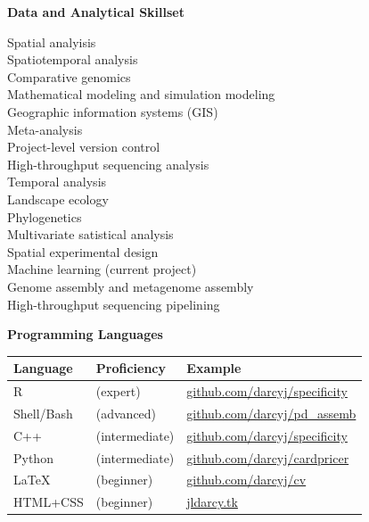 \documentclass{article}
\begin{document}
{\large  \textbf{Data and Analytical Skillset}}
  \begin{adjustwidth}{2mm}{}\begin{multicols}{2}
    Spatial analyisis \cite{Darcy2018a,Darcy2011a,Darcy640029}\\
    Spatiotemporal analysis \cite{Darcy640029,Darcy2017,Nemergut2016}\\
    Comparative genomics \cite{Darcy2018,Lynch2014}\\
    Mathematical modeling and simulation modeling \cite{Darcy685644,Darcy640029, Darcy2016}\\
    Geographic information systems (GIS) \cite{Darcy640029,Darcy2018a,Darcy2017}\\
    Meta-analysis \cite{Darcy685644,Darcy2018a,Darcy2011a}\\
    Project-level version control \cite[\href{https://github.com/darcyj/specificity}{specificity} R package]{Darcy2018}\\
    High-throughput sequencing analysis \cite{Darcy685644,Darcy640029,Darcy2018a}\\

    Temporal analysis \cite{Darcy685644,Knelman2014,Kennedy2016}\\
    Landscape ecology \cite{Darcy640029,Darcy2018,Darcy2017}\\
    Phylogenetics \cite{Darcy2011a,Schmidt2015a,Naff2013}\\
    Multivariate satistical analysis \cite{Darcy640029,Darcy2017,Gendron2019}\\
    Spatial experimental design \cite{Darcy2018a,Darcy2017,Darcy2018}\\
    Machine learning (current project)\\
    Genome assembly and metagenome assembly \cite{Darcy2018,Lynch2014}\\
    High-throughput sequencing pipelining \cite{Darcy685644,Darcy640029,Darcy2018a}

  \end{multicols}\end{adjustwidth}

{\large  \textbf{Programming Languages}}
\\\begin{tabular}{l l l}
  Language & Proficiency & Example\\
  \hline
  R & (expert) & \href{https://github.com/darcyj/specificity}{github.com/darcyj/specificity}\\
  Shell/Bash & (advanced) & \href{https://github.com/darcyj/pd_assemb}{github.com/darcyj/pd\_assemb}\\
  C++ & (intermediate) & \href{https://github.com/darcyj/specificity}{github.com/darcyj/specificity}\\ 
  Python & (intermediate) & \href{https://github.com/darcyj/cardpricer}{github.com/darcyj/cardpricer}\\
  \LaTeX & (beginner) & \href{https://github.com/darcyj/cv}{github.com/darcyj/cv}\\
  HTML+CSS & (beginner) & \href{jldarcy.tk}{jldarcy.tk}\\
\end{tabular}
\end{document}
